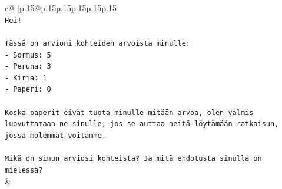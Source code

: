 \documentclass{article}
\begin{document}
{\begin{supertabular}{c@{$\;$}|p{.15\linewidth}@{}p{.15\linewidth}p{.15\linewidth}p{.15\linewidth}p{.15\linewidth}p{.15\linewidth}}
{{{\\ 
\texttt{Hei!} \\
\\ 
\texttt{Tässä on arvioni kohteiden arvoista minulle:} \\
\texttt{{-} Sormus: 5} \\
\texttt{{-} Peruna: 3} \\
\texttt{{-} Kirja: 1} \\
\texttt{{-} Paperi: 0} \\
\\ 
\texttt{Koska paperit eivät tuota minulle mitään arvoa, olen valmis luovuttamaan ne sinulle, jos se auttaa meitä löytämään ratkaisun, jossa molemmat voitamme.} \\
\\ 
\texttt{Mikä on sinun arviosi kohteista? Ja mitä ehdotusta sinulla on mielessä?} \\
            }
        }
    }
    & \\ \\


\end{supertabular}}
\end{document}

